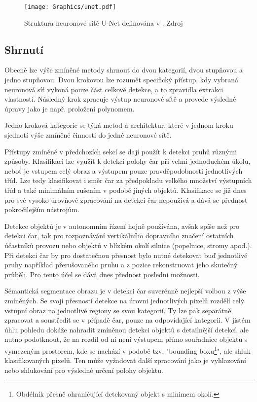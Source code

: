 \documentclass[czech, bc, kky, he, iso690numb]{fasthesis}
\begin{document}
	            	\begin{figure}[h]
	            		\centering
	            		\texttt{[image: Graphics/unet.pdf]}
	            		\caption{Struktura neuronové sítě U-Net definována v \cite{U-Net}. Zdroj \cite{U-Net}}
	            		\label{pic:unet}
	            	\end{figure}
            	
            \subsection{Shrnutí}
            	Obecně lze výše zmíněné metody shrnout do dvou kategorií, dvou stupňovou a jedno stupňovou. Dvou krokovou lze rozumět specifický přístup, kdy vybraná neuronová síť vykoná pouze část celkové detekce, a to zpravidla extrakci vlastností. Následný krok zpracuje výstup neuronové sítě a provede výsledné úpravy jako je např. proložení polynomem.
            	
            	Jedno kroková kategorie se týká metod a architektur, které v jednom kroku sjednotí výše zmíněné činnosti do jedné neuronové sítě.
            	
            	Přístupy zmíněné v předchozích sekcí se dají použít k detekci pruhů různými způsoby. Klasifikaci lze využít k detekci polohy čar při velmi jednoduchém úkolu, neboť je vstupem celý obraz a výstupem pouze pravděpodobnosti jednotlivých tříd. Lze tedy klasifikovat i směr čar za předpokladu velkého množství výstupních tříd a také minimálním rušením v podobě jiných objektů. Klasifikace se již dnes pro své vysoko-úrovňové zpracování na detekci čar nepoužívá a dává se přednost pokročilejším nástrojům.
            	
            	Detekce objektů je v autonomním řízení hojně používána, avšak spíše než pro detekci čar, tak pro rozpoznávání vertikálního dopravního značení ostatních účastníků provozu nebo objektů v blízkém okolí silnice (popelnice, stromy apod.). Při detekci čar by pro dostatečnou přesnost bylo nutné detekovat buď jednotlivé pruhy například přerušovaného pruhu a z pozice rekonstruovat jeho skutečný průběh. Pro tento účel se dává dnes přednost poslední možnosti.
            	
            	Sémantická segmentace obrazu je v detekci čar suverénně nejlepší volbou z výše zmíněných. Se svojí přesností detekce na úrovni jednotlivých pixelů rozdělí celý vstupní obraz na jednotlivé regiony se svou kategorií. Ty lze pak separátně zpracovat a soustředit se v případě čar, pouze na odpovídající kategorii. V jistém úhlu pohledu dokáže nahradit zmíněnou detekci objektů s detailnější detekcí, ale nutno podotknout, že na rozdíl od ní není výstupem přímo souřadnice objektu s vymezeným prostorem, kde se nachází v podobě tzv. "bounding boxu\footnote{Obdélník přesně ohraničující detekovaný objekt s minimem okolí.}", ale shluk klasifikovaných pixelů. Ten může vyžadovat další zpracování jako je vyhlazování nebo shlukování pro výsledné určení polohy objektu.
            	
\end{document}
